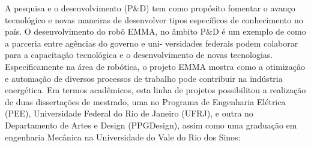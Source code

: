 A pesquisa e o desenvolvimento (P\&D) tem como propósito fomentar o avanço
tecnológico e novas maneiras de desenvolver tipos específicos de conhecimento
no país. O desenvolvimento do robô EMMA, no âmbito P\&D é um exemplo de como a
parceria entre agências do governo e uni- versidades federais podem colaborar
para a capacitação tecnológica e o desenvolvimento de novas tecnologias.
Especificamente na área de robótica, o projeto EMMA mostra como a otimização e
automação de diversos processos de trabalho pode contribuir na indústria
energética. Em termos acadêmicos, esta linha de projetos possibilitou a
realização de duas
dissertações de mestrado, uma no Programa de Engenharia Elétrica (PEE),
Universidade Federal do Rio de Janeiro (UFRJ), e outra no Departamento
de Artes e Design (PPGDesign), assim como uma graduação em engenharia
Mecânica na Universidade do Vale do Rio dos Sinos:%


%


%
%




